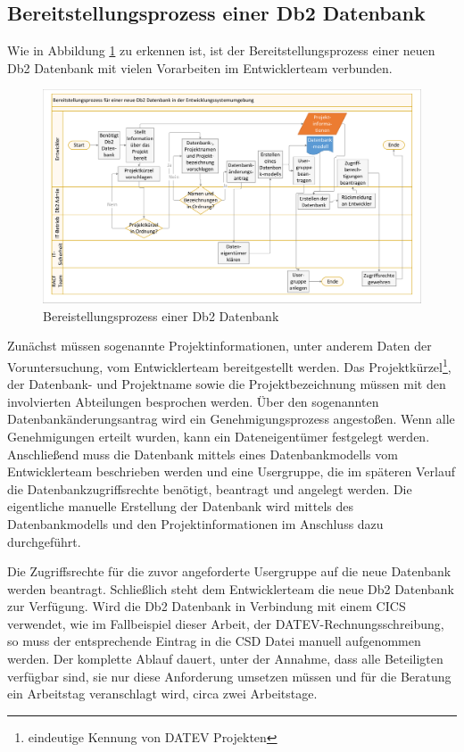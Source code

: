 \subsection{Bereitstellungsprozess einer Db2 Datenbank}
Wie in Abbildung \ref{fig:aktdb2} zu erkennen ist, ist der Bereitstellungsprozess einer neuen Db2 Datenbank mit vielen Vorarbeiten im Entwicklerteam verbunden.
\begin{figure}[ht!]
\centering
\includegraphics[width=\paperwidth,angle=90]{figures/swimlaneDb2.pdf}
\caption{Bereistellungsprozess einer Db2 Datenbank}
\label{fig:aktdb2}
\end{figure}
Zunächst müssen sogenannte Projektinformationen, unter anderem Daten der Voruntersuchung, vom Entwicklerteam bereitgestellt werden.
Das Projektkürzel\footnote{eindeutige Kennung von DATEV Projekten}, der Datenbank- und Projektname sowie die Projektbezeichnung müssen mit den involvierten Abteilungen besprochen werden.
Über den sogenannten \glqq Datenbankänderungsantrag\grqq{} wird ein Genehmigungsprozess angestoßen.
Wenn alle Genehmigungen erteilt wurden, kann ein Dateneigentümer festgelegt werden.
Anschließend muss die Datenbank mittels eines Datenbankmodells vom Entwicklerteam beschrieben werden und eine Usergruppe, die im späteren Verlauf die Datenbankzugriffsrechte benötigt, beantragt und angelegt werden.
Die eigentliche manuelle Erstellung der Datenbank wird mittels des Datenbankmodells und den Projektinformationen im Anschluss dazu durchgeführt.

Die Zugriffsrechte für die zuvor angeforderte Usergruppe auf die neue Datenbank werden beantragt.
Schließlich steht dem Entwicklerteam die neue Db2 Datenbank zur Verfügung.
Wird die Db2 Datenbank in Verbindung mit einem CICS verwendet, wie im Fallbeispiel dieser Arbeit, der DATEV-Rechnungsschreibung, so muss der entsprechende Eintrag in die CSD Datei manuell aufgenommen werden. 
Der komplette Ablauf dauert, unter der Annahme, dass alle Beteiligten verfügbar sind, sie nur diese Anforderung umsetzen müssen und für die Beratung ein Arbeitstag veranschlagt wird, circa zwei Arbeitstage.


